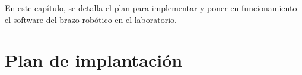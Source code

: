 En este capítulo, se detalla el plan para implementar y poner en funcionamiento el software del brazo robótico en el laboratorio.
\section{Plan de implantación}
